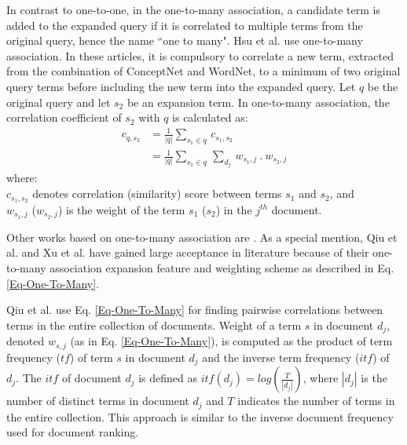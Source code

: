 In contrast to one-to-one, in the one-to-many association, a candidate term is added to the expanded query if it is correlated to multiple terms from the original query, hence the name ``one to many". Hsu et al. \cite{hsu2006query,hsu2008combining} use one-to-many association. In these articles, it is compulsory to correlate a new term, extracted from the combination of ConceptNet and WordNet, to a minimum of two original query terms before including the new term into the expanded query. Let $q$ be the original query and let $s_2$ be an expansion term. In one-to-many association, the correlation coefficient of $s_2$ with $q$ is calculated as:
\begin{equation}
\begin{split}
c_{q, s_2} &=\frac{1}{|q|}\sum_{s_1\in q}\, c_{s_1, s_2} \\
& =\frac{1}{|q|}\sum_{s_1\in q}\, \sum_{d_j}\, w_{s_1, j} \:.\: w_{s_2, j}
\end{split}
\label{Eq-One-To-Many}
\end{equation}
where:\\ $c_{s_1, s_2}$ denotes correlation (similarity) score between terms $s_1$ and $s_2$, and\\ $w_{s_1, j}$ ($w_{s_2, j}$) is the weight of the term $s_1$ ($s_2$) in the $j^{th}$ document.

Other works based on one-to-many association are \cite{qiu1993concept,xu1996query,cui2003query,bai2005query,sun2006mining,riezler2008translating,bhatia2011query,gan2015improving,kuzi2016query}. As a special mention, Qiu et al. \cite{qiu1993concept} and Xu et al. \cite{xu1996query} have gained large acceptance in literature because of their  one-to-many association expansion feature and weighting scheme as described in Eq. \ref{Eq-One-To-Many}. 

Qiu et al. \cite{qiu1993concept} use Eq. \ref{Eq-One-To-Many} for finding pairwise correlations between terms in the entire collection of documents. Weight of a term $s$ in document $d_j$, denoted  $w_{s,j}$ (as in Eq. \ref{Eq-One-To-Many}), is computed as the product of term frequency ($tf$) of term $s$ in document  $d_j$ and the inverse term frequency ($itf$) of $d_j$. The $itf$ of  document  $d_j$ is defined as $itf(d_j)=log(\frac{T}{|d_j|})$, where $|d_j|$ is the number of distinct terms in document $d_j$ and $T$ indicates the number of terms in the entire collection. This approach is similar to the inverse document frequency used for document ranking.

